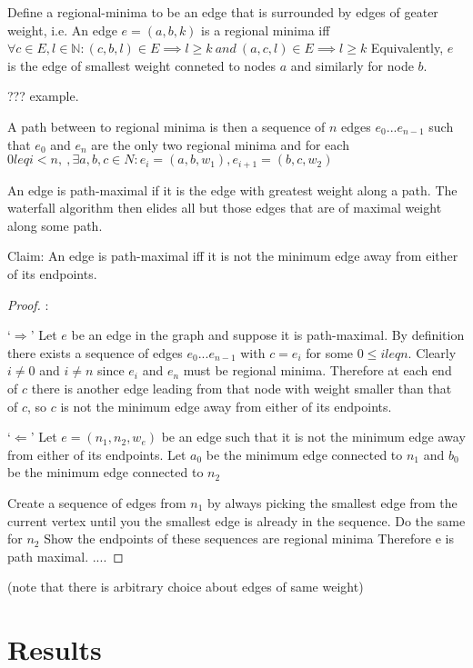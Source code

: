 \documentclass{jfp}
\begin{document}
Define a regional-minima to be an edge that is surrounded by edges of geater weight, i.e.
An edge $e = (a,b,k)$ is a regional minima iff
$\forall c \in E, l \in \mathbb{N} :
  (c,b,l) \in E \implies l \geq k\ and\
  (a,c,l) \in E \implies l \geq k $
Equivalently, $e$ is the edge of smallest weight conneted to nodes $a$ and similarly for node $b$.

??? example.

A path between to regional minima is then a sequence of $n$ edges $e_0 ... e_{n-1}$
such that $e_0$ and $e_n$ are the only two regional minima
and for each $ 0 leq i < n,\ , \exists a,b,c \in N \colon e_i = (a,b,w_1) , e_{i+1} = (b,c,w_2)$

\noindent An edge is path-maximal if it is the edge with greatest weight along a path.
The waterfall algorithm then elides all but those edges that are of maximal weight along some path.

\noindent Claim: An edge is path-maximal iff it is not the minimum edge away from either of its endpoints.

\begin{proof}:

\noindent `$\Rightarrow$'
\indent
  Let $e$ be an edge in the graph and suppose it is path-maximal.
  By definition there exists a sequence of edges $e_0 ... e_{n-1}$
  with $c = e_i$ for some $ 0 \leq i leq n$. Clearly $i \neq 0$ and $i \neq n$ since
  $e_i$ and $e_n$ must be regional minima. Therefore at each end of $c$ there is another edge
  leading from that node with weight smaller than that of $c$, so $c$ is
  not the minimum edge away from either of its endpoints.


\noindent
`$\Leftarrow$'
\indent
  Let $e = (n_1,n_2,w_e)$ be an edge such that it is not the minimum edge away from either of its endpoints.
  Let  $a_0$ be the minimum edge connected to $n_1$ and $b_0$ be the minimum edge connected to $n_2$

  Create a sequence of edges from $n_1$ by always picking the smallest edge from the current vertex until
  you the smallest edge is already in the sequence.
  Do  the same for $n_2$
  Show the endpoints of these sequences are regional minima
  Therefore e is path maximal.
  ....


\end{proof}


(note that there is arbitrary choice about edges of same weight)




\section{Results}
\end{document}
